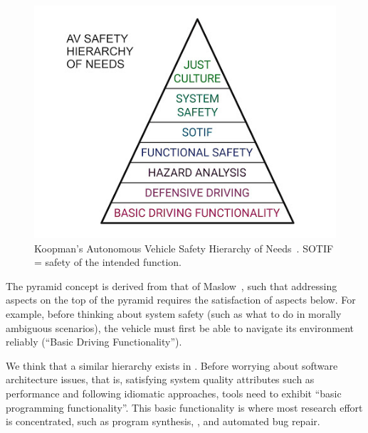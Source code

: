 \begin{figure}[hbt!]
    \centering
    \includegraphics[width=\linewidth]{Figures/koopman_pyramid.png}
    \caption{Koopman's Autonomous Vehicle Safety Hierarchy of Needs~\cite{koopman}. SOTIF = safety of the intended function.}
    \label{fig:koopman_pyramid}
\end{figure}

The pyramid concept is derived from that of Maslow~\cite{Maslow1943}, such that addressing aspects on the top of the pyramid requires the satisfaction of aspects below. 
For example, before thinking about system safety (such as what to do in morally ambiguous scenarios), the vehicle must first be able to navigate its environment reliably (``Basic Driving Functionality'').

We think that a similar hierarchy exists in \AISE{}. Before worrying about software architecture issues, that is, satisfying system quality attributes such as performance and following idiomatic approaches, \AISE{} tools need to exhibit ``basic programming functionality''. This basic functionality is where most research effort is concentrated, such as program synthesis, \cct{}, and automated bug repair.









